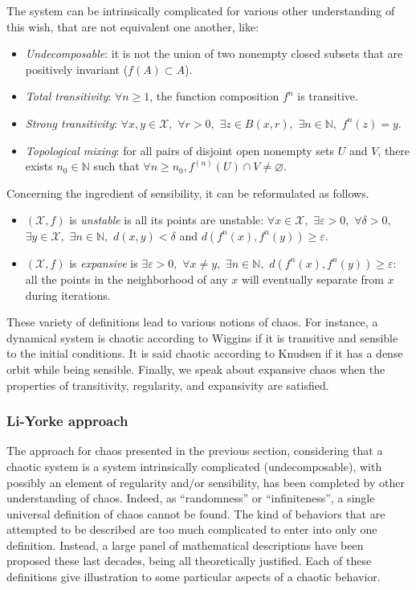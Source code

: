 The system can be intrinsically complicated for various other understanding of this wish, that are 
not equivalent one another, like:
\begin{itemize}
    \item \emph{Undecomposable}: it is not the union of two nonempty closed subsets that are positively invariant ($f(A) \subset A$).
  \item \emph{Total transitivity}: $\forall n \geqslant 1$, the function composition $f^{n}$ is transitive.
  \item \emph{Strong transitivity}: $\forall x,y \in \mathcal{X},$ $\forall r>0,$ $\exists z \in B(x,r),$ $\exists n \in \mathbb{N},$ $f^{n}(z)=y.$
  \item \emph{Topological mixing}:  for all pairs of disjoint open nonempty sets $U$ and $V$, there exists $n_0 \in \mathbb{N}$ such that $\forall n \geqslant n_0, f^{(n)}(U) \cap V \neq \varnothing$.
\end{itemize}


Concerning the ingredient of sensibility, it can be reformulated as follows.
\begin{itemize}
  \item $(\mathcal{X},f)$ is \emph{unstable} is all its points are unstable: $\forall x \in \mathcal{X},$ $\exists \varepsilon >0,$ $\forall \delta > 0,$ $\exists y \in \mathcal{X},$ $\exists n \in \mathbb{N},$ $d(x,y)<\delta$ and $d(f^{n}(x),f^{n}(y)) \geqslant \varepsilon$.
  \item $(\mathcal{X},f)$ is \emph{expansive} is $\exists \varepsilon >0,$ $\forall x \neq y,$ $\exists n \in \mathbb{N},$ $d(f^{n}(x),f^{n}(y)) \geqslant \varepsilon$:
all the points in the neighborhood of any $x$ will eventually separate from $x$
during iterations.
\end{itemize}

These variety of definitions lead to various notions of chaos. For instance, 
a dynamical system is chaotic according to Wiggins if it is transitive and
sensible to the initial conditions. It is said chaotic according to Knudsen
if it has a dense orbit while being sensible. Finally, we speak about
expansive chaos when the properties of transitivity, regularity, and expansivity
are satisfied.

\subsubsection{Li-Yorke approach}


The approach for chaos presented in the previous section, considering that
a chaotic system is a system intrinsically complicated (undecomposable),
with possibly an element of regularity and/or sensibility, has been
completed by other understanding of chaos. Indeed, as ``randomness''
or ``infiniteness'', a single universal definition of chaos cannot
be found. The kind of behaviors that are attempted to be described are
too much complicated to enter into only one definition. Instead, a 
large panel of mathematical descriptions have been proposed these last
decades, being all theoretically justified. Each of these definitions
give illustration to some particular aspects of a chaotic behavior.

